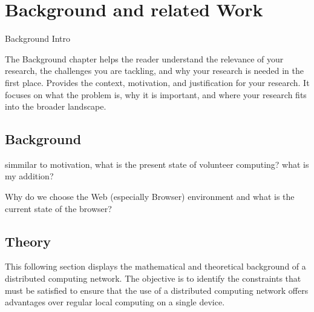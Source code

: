 \chapter{Background and related Work}
\label{ch:background}
Background Intro

The Background chapter helps the reader understand the relevance of your research, the challenges you are tackling, and why your research is needed in the first place.
Provides the context, motivation, and justification for your research. It focuses on what the problem is, why it is important, and where your research fits into the broader landscape.

\section{Background}
\label{sec:background:background}
simmilar to motivation, what is the present state of volunteer computing? what is my addition?

Why do we choose the Web (especially Browser) environment and what is the current state of the browser?

\section{Theory}
\label{sec:background:theory}
This following section displays the mathematical and theoretical background of a distributed computing network. The objective is to identify the constraints that must be satisfied to ensure that the use of a distributed computing network offers advantages over regular local computing on a single device.

